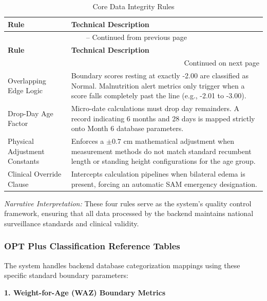 \documentclass[12pt, a4paper]{report}
\begin{document}
\vspace{0.3cm}
\begin{longtable}{p{3.5cm} p{10.5cm}}
    \caption{Core Data Integrity Rules} \label{tab:integrity} \\
    \toprule
    \textbf{Rule} & \textbf{Technical Description} \\
    \midrule
    \endfirsthead
    \multicolumn{2}{c}{{\tablename\ \thetable{} -- Continued from previous page}} \\
    \toprule
    \textbf{Rule} & \textbf{Technical Description} \\
    \midrule
    \endhead
    \midrule
    \multicolumn{2}{r}{{Continued on next page}} \\
    \endfoot
    \bottomrule
    \endlastfoot
    Overlapping Edge Logic & Boundary scores resting at exactly -2.00 are classified as Normal. Malnutrition alert metrics only trigger when a score falls completely past the line (e.g., -2.01 to -3.00). \\
    \addlinespace
    Drop-Day Age Factor & Micro-date calculations must drop day remainders. A record indicating 6 months and 28 days is mapped strictly onto Month 6 database parameters. \\
    \addlinespace
    Physical Adjustment Constants & Enforces a \(\pm0.7\) cm mathematical adjustment when measurement methods do not match standard recumbent length or standing height configurations for the age group. \\
    \addlinespace
    Clinical Override Clause & Intercepts calculation pipelines when bilateral edema is present, forcing an automatic SAM emergency designation. \\
\end{longtable}
\vspace{0.3cm}

\textit{Narrative Interpretation:} These four rules serve as the system's quality control framework, ensuring that all data processed by the backend maintains national surveillance standards and clinical validity.

\subsubsection{OPT Plus Classification Reference Tables}
\label{subsubsec:opt_tables}
The system handles backend database categorization mappings using these specific standard boundary parameters:

\noindent \textbf{1. Weight-for-Age (WAZ) Boundary Metrics}
\end{document}

